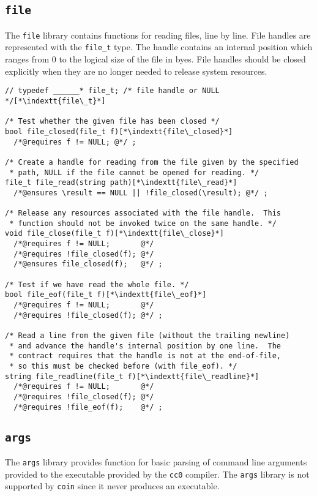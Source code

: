 \documentclass[11pt]{article}
\makeatletter
\newcommand{\indextt}[1]{\index{#1@\texttt{#1}}}
\makeatother
\begin{document}
\newpage
\subsection{\tt file}

The \lstinline'file' library contains functions for reading files, line by
line.  File handles are represented with the \lstinline'file_t' type.  The
handle contains an internal position which ranges from 0 to the
logical size of the file in byes.  File handles should be closed
explicitly when they are no longer needed to release system resources.

\begin{lstlisting}
// typedef ______* file_t; /* file handle or NULL */[*\indextt{file\_t}*]

/* Test whether the given file has been closed */
bool file_closed(file_t f)[*\indextt{file\_closed}*]
  /*@requires f != NULL; @*/ ;

/* Create a handle for reading from the file given by the specified
 * path, NULL if the file cannot be opened for reading. */
file_t file_read(string path)[*\indextt{file\_read}*]
  /*@ensures \result == NULL || !file_closed(\result); @*/ ;

/* Release any resources associated with the file handle.  This
 * function should not be invoked twice on the same handle. */
void file_close(file_t f)[*\indextt{file\_close}*]
  /*@requires f != NULL;       @*/
  /*@requires !file_closed(f); @*/
  /*@ensures file_closed(f);   @*/ ;

/* Test if we have read the whole file. */
bool file_eof(file_t f)[*\indextt{file\_eof}*]
  /*@requires f != NULL;       @*/
  /*@requires !file_closed(f); @*/ ;

/* Read a line from the given file (without the trailing newline)
 * and advance the handle's internal position by one line.  The
 * contract requires that the handle is not at the end-of-file,
 * so this must be checked before (with file_eof). */
string file_readline(file_t f)[*\indextt{file\_readline}*]
  /*@requires f != NULL;       @*/
  /*@requires !file_closed(f); @*/
  /*@requires !file_eof(f);    @*/ ;
\end{lstlisting}


\clearpage
\subsection{\tt args}

The \lstinline'args' library provides function for basic parsing of command
line arguments provided to the executable provided by the \lstinline'cc0'
compiler.  The \lstinline'args' library is not supported by \lstinline'coin'
since it never produces an executable.
\end{document}
